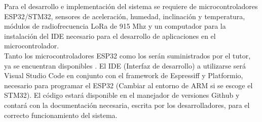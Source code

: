 \documentclass[12pt,letterpaper]{article}
\begin{document}
	Para el desarrollo e implementación del sistema se requiere de microcontroladores ESP32/STM32, sensores de aceleración, humedad, inclinación y temperatura, módulos de radiofrecuencia LoRa de 915 Mhz y un computador para la instalación del IDE necesario para el desarrollo de aplicaciones en el microcontrolador.\\
	
	Tanto los microcontroladores ESP32 como los serán suministrados por el tutor, ya se encuentran disponibles . El IDE (Interfaz de desarrollo) a utilizarse será Visual Studio Code en conjunto con el framework de Espressiff y Platformio, necesario para programar el ESP32 (Cambiar al entorno de ARM si se escoge el STM32). El código estará disponible en el manejador de versiones Github y contará con la documentación necesaria, escrita por los desarrolladores, para el correcto funcionamiento del sistema.	\\
	
	
	
\newpage
	


	
\end{document}
